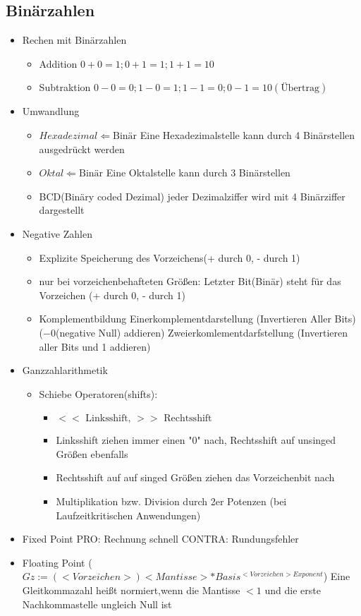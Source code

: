 \documentclass[10pt,a5paper]{article}
\begin{document}
\subsection{Binärzahlen}
\begin{itemize}
\item Rechen mit Binärzahlen\begin{itemize}
\item Addition
\subitem \ensuremath{0+0=1;0+1=1;1+1=10}
\item Subtraktion
\subitem \ensuremath{0-0=0;1-0=1;1-1=0;0-1=10(\text{Übertrag})}
\end{itemize}
\item Umwandlung \begin{itemize}
\item \ensuremath{Hexadezimal\Leftarrow \text{Binär}}
\subitem Eine Hexadezimalstelle kann durch 4 Binärstellen ausgedrückt werden
\item \ensuremath{Oktal\Leftarrow \text{Binär}}
\subitem Eine Oktalstelle kann durch 3 Binärstellen
\item BCD(Binäry coded Dezimal)
\subitem jeder Dezimalziffer wird mit 4 Binärziffer dargestellt
\end{itemize}
\item Negative Zahlen\begin{itemize}
\item Explizite Speicherung des Vorzeichens(+ durch 0, - durch 1)
\item nur bei vorzeichenbehafteten Größen:
\subitem Letzter Bit(Binär) steht für das Vorzeichen (+ durch 0, - durch 1)
\item Komplementbildung
\subitem Einerkomplementdarstellung (Invertieren Aller Bits) (\ensuremath{-0}(negative Null) addieren)
\subitem Zweierkomlementdarfstellung (Invertieren aller Bits und 1 addieren)
\end{itemize}
\item Ganzzahlarithmetik\begin{itemize}
\item Schiebe Operatoren(shifts): \begin{itemize}
\item \ensuremath{<< \text{ Linksshift, } >> \text{ Rechtsshift}}
\item Linksshift ziehen immer einen "0" nach, Rechtsshift auf unsinged Größen ebenfalls
\item Rechtsshift auf auf singed Größen ziehen das Vorzeichenbit nach
\item Multiplikation bzw. Division durch 2er Potenzen (bei Laufzeitkritischen Anwendungen)
\end{itemize}
\end{itemize}
\item Fixed Point
\subitem PRO: Rechnung schnell
\subitem CONTRA: Rundungsfehler
\item Floating Point (\ensuremath{Gz:=(<Vorzeichen>)<Mantisse>*Basis^{<Vorzeichen>Exponent}})
\subitem Eine Gleitkommazahl heißt normiert,wenn die Mantisse \ensuremath{<1} und die erste Nachkommastelle ungleich Null ist
\end{itemize}
\end{document}
